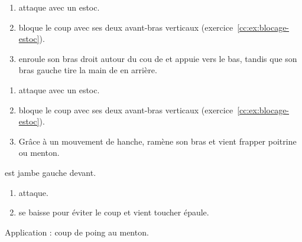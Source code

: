 \begin{technique}

\begin{enumerate}
	\item \A attaque \D avec un estoc.
	
	\item \D bloque le coup avec ses deux avant-bras verticaux (exercice~\ref{cc:ex:blocage-estoc}).
	
	\item \D enroule son bras droit autour du cou de \A et appuie vers le bas, tandis que son bras gauche tire la main de \A en arrière.
\end{enumerate}

\end{technique}


\begin{technique}

\begin{enumerate}
	\item \A attaque \D avec un estoc.
	
	\item \D bloque le coup avec ses deux avant-bras verticaux (exercice~\ref{cc:ex:blocage-estoc}).
	
	\item Grâce à un mouvement de hanche, \D ramène son bras et vient frapper poitrine ou menton.
\end{enumerate}

\end{technique}


\begin{exercice}

\D est jambe gauche devant.

\begin{enumerate}
	\item \A attaque.
	
	\item \D se baisse pour éviter le coup et vient toucher épaule.
\end{enumerate}

Application : coup de poing au menton.

\end{exercice}


